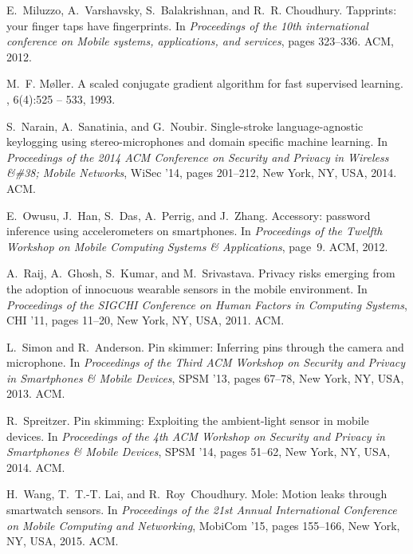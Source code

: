 \documentclass[10pt,twocolumn]{article}
\begin{document}
\begin{thebibliography}{10}
E.~Miluzzo, A.~Varshavsky, S.~Balakrishnan, and R.~R. Choudhury.
\newblock Tapprints: your finger taps have fingerprints.
\newblock In {\em Proceedings of the 10th international conference on Mobile
  systems, applications, and services}, pages 323--336. ACM, 2012.

M.~F. Møller.
\newblock A scaled conjugate gradient algorithm for fast supervised learning.
, 6(4):525 -- 533, 1993.

S.~Narain, A.~Sanatinia, and G.~Noubir.
\newblock Single-stroke language-agnostic keylogging using stereo-microphones
  and domain specific machine learning.
\newblock In {\em Proceedings of the 2014 ACM Conference on Security and
  Privacy in Wireless \&\#38; Mobile Networks}, WiSec '14, pages 201--212, New
  York, NY, USA, 2014. ACM.

E.~Owusu, J.~Han, S.~Das, A.~Perrig, and J.~Zhang.
\newblock Accessory: password inference using accelerometers on smartphones.
\newblock In {\em Proceedings of the Twelfth Workshop on Mobile Computing
  Systems \& Applications}, page~9. ACM, 2012.

A.~Raij, A.~Ghosh, S.~Kumar, and M.~Srivastava.
\newblock Privacy risks emerging from the adoption of innocuous wearable
  sensors in the mobile environment.
\newblock In {\em Proceedings of the SIGCHI Conference on Human Factors in
  Computing Systems}, CHI '11, pages 11--20, New York, NY, USA, 2011. ACM.

L.~Simon and R.~Anderson.
\newblock Pin skimmer: Inferring pins through the camera and microphone.
\newblock In {\em Proceedings of the Third ACM Workshop on Security and Privacy
  in Smartphones \& Mobile Devices}, SPSM '13, pages 67--78, New York, NY, USA,
  2013. ACM.

R.~Spreitzer.
\newblock Pin skimming: Exploiting the ambient-light sensor in mobile devices.
\newblock In {\em Proceedings of the 4th ACM Workshop on Security and Privacy
  in Smartphones \& Mobile Devices}, SPSM '14, pages 51--62, New York, NY, USA,
  2014. ACM.

H.~Wang, T.~T.-T. Lai, and R.~Roy~Choudhury.
\newblock Mole: Motion leaks through smartwatch sensors.
\newblock In {\em Proceedings of the 21st Annual International Conference on
  Mobile Computing and Networking}, MobiCom '15, pages 155--166, New York, NY,
  USA, 2015. ACM.


\end{thebibliography}
\end{document}
